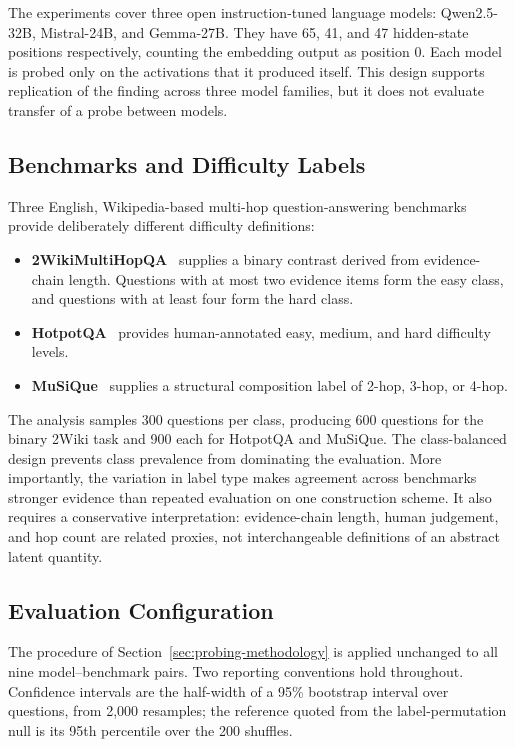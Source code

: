 The experiments cover three open instruction-tuned language models:
Qwen2.5-32B, Mistral-24B, and Gemma-27B. They have 65, 41, and 47 hidden-state
positions respectively, counting the embedding output as position \(0\). Each model is probed only on the activations
that it produced itself. This design supports replication of the finding across
three model families, but it does not evaluate transfer of a probe between
models.

\subsection{Benchmarks and Difficulty Labels}
\label{subsec:probing-benchmarks}

Three English, Wikipedia-based multi-hop question-answering benchmarks provide
deliberately different difficulty definitions:

\begin{itemize}
  \item \textbf{2WikiMultiHopQA}~\cite{ho2020constructing} supplies a binary
        contrast derived from evidence-chain length. Questions with at most two
        evidence items form the easy class, and questions with at least four
        form the hard class.
  \item \textbf{HotpotQA}~\cite{yang2018hotpotqa} provides human-annotated
        easy, medium, and hard difficulty levels.
  \item \textbf{MuSiQue}~\cite{trivedi2022musique} supplies a structural
        composition label of 2-hop, 3-hop, or 4-hop.
\end{itemize}

The analysis samples 300 questions per class, producing 600 questions for the
binary 2Wiki task and 900 each for HotpotQA and MuSiQue. The class-balanced
design prevents class prevalence from dominating the evaluation. More
importantly, the variation in label type makes agreement across benchmarks
stronger evidence than repeated evaluation on one construction scheme. It also
requires a conservative interpretation: evidence-chain length, human judgement,
and hop count are related proxies, not interchangeable definitions of an
abstract latent quantity.

\subsection{Evaluation Configuration}
\label{subsec:probing-evaluation}

The procedure of Section~\ref{sec:probing-methodology} is applied unchanged to
all nine model--benchmark pairs. Two reporting conventions hold throughout.
Confidence intervals are the half-width of a 95\% bootstrap interval over
questions, from 2,000 resamples; the reference quoted from the
label-permutation null is its 95th percentile over the 200 shuffles.

